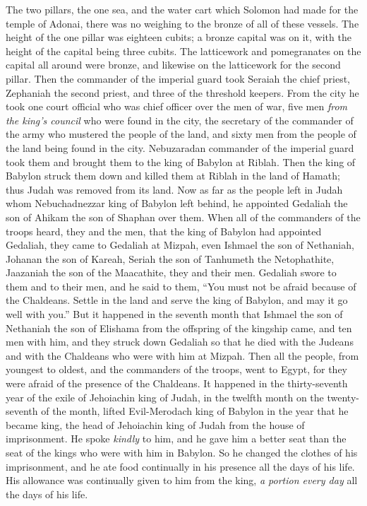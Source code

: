 \begin{biblechapter}
\verse The two pillars, the one sea, and the water cart which Solomon had made for the temple of Adonai, there was no weighing to the bronze of all of these vessels.
\verse The height of the one pillar was eighteen cubits; a bronze capital was on it, with the height of the capital being three cubits. The latticework and pomegranates on the capital all around were bronze, and likewise on the latticework for the second pillar.
\verse Then the commander of the imperial guard took Seraiah the chief priest, Zephaniah the second priest, and three of the threshold keepers.
\verse From the city he took one court official who was chief officer over the men of war, five men \textit{from the king’s council} who were found in the city, the secretary of the commander of the army who mustered the people of the land, and sixty men from the people of the land being found in the city.
\verse Nebuzaradan commander of the imperial guard took them and brought them to the king of Babylon at Riblah.
\verse Then the king of Babylon struck them down and killed them at Riblah in the land of Hamath; thus Judah was removed from its land.
 Now as far as the people left in Judah whom Nebuchadnezzar king of Babylon left behind, he appointed Gedaliah the son of Ahikam the son of Shaphan over them.
\verse When all of the commanders of the troops heard, they and the men, that the king of Babylon had appointed Gedaliah, they came to Gedaliah at Mizpah, even Ishmael the son of Nethaniah, Johanan the son of Kareah, Seriah the son of Tanhumeth the Netophathite, Jaazaniah the son of the Maacathite, they and their men.
\verse Gedaliah swore to them and to their men, and he said to them, “You must not be afraid because of the Chaldeans. Settle in the land and serve the king of Babylon, and may it go well with you.”
\verse But it happened in the seventh month that Ishmael the son of Nethaniah the son of Elishama from the offspring of the kingship came, and ten men with him, and they struck down Gedaliah so that he died with the Judeans and with the Chaldeans who were with him at Mizpah.
\verse Then all the people, from youngest to oldest, and the commanders of the troops, went to Egypt, for they were afraid of the presence of the Chaldeans.
 It happened in the thirty-seventh year of the exile of Jehoiachin king of Judah, in the twelfth month on the twenty-seventh of the month, lifted Evil-Merodach king of Babylon in the year that he became king, the head of Jehoiachin king of Judah from the house of imprisonment.
\verse He spoke \textit{kindly} to him, and he gave him a better seat than the seat of the kings who were with him in Babylon.
\verse So he changed the clothes of his imprisonment, and he ate food continually in his presence all the days of his life.
\verse His allowance was continually given to him from the king, \textit{a portion every day} all the days of his life.
\end{biblechapter}

